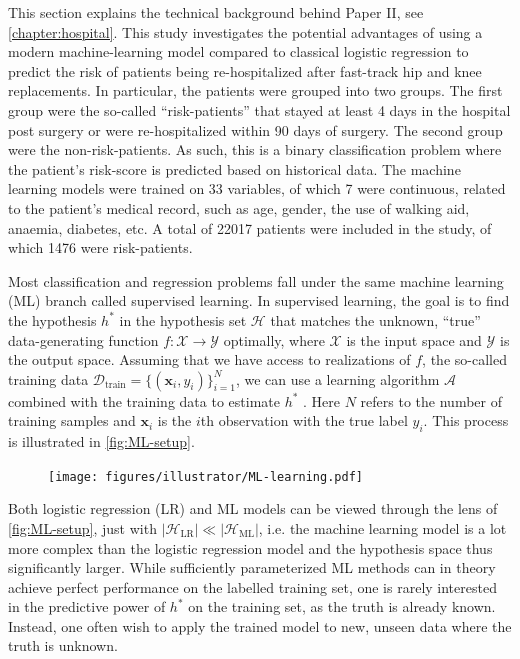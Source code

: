 
This section explains the technical background behind Paper II, see \autoref{chapter:hospital}. This study investigates the potential advantages of using a modern machine-learning model compared to classical logistic regression to predict the risk of patients being re-hospitalized after fast-track hip and knee replacements. In particular, the patients were grouped into two groups. The first group were the so-called ``risk-patients'' that stayed at least 4 days in the hospital post surgery or were re-hospitalized within 90 days of surgery. The second group were the non-risk-patients. As such, this is a binary classification problem where the patient's risk-score is predicted based on historical data. The machine learning models were trained on 33 variables, of which 7 were continuous, related to the patient's medical record, such as age, gender, the use of walking aid, anaemia, diabetes, etc. A total of \num{22017} patients were included in the study, of which \num{1476} were risk-patients.


Most classification and regression problems fall under the same machine learning (ML) branch called supervised learning. In supervised learning, the goal is to find the hypothesis $h^*$ in the hypothesis set $\mathcal{H}$ that matches the unknown, ``true'' data-generating function $f: \mathcal{X} \rightarrow \mathcal{Y}$ optimally, where $\mathcal{X}$ is the input space and $\mathcal{Y}$ is the output space. Assuming that we have access to realizations of $f$, the so-called training data $\mathcal{D}_\mathrm{train} = \{(\mathbf{x}_i, y_i)\}_{i=1}^N$, we can use a learning algorithm $\mathcal{A}$ combined with the training data to estimate $h^*$ \autocite{abu-mostafaLearningData2012a}. Here $N$ refers to the number of training samples and $\mathbf{x}_i$ is the $i$th observation with the true label $y_i$. This process is illustrated in \autoref{fig:ML-setup}.

\begin{figure}[htbp]
    \centering
    \texttt{[image: figures/illustrator/ML-learning.pdf]}
\end{figure}

Both logistic regression (LR) and ML models can be viewed through the lens of \autoref{fig:ML-setup}, just with $|\mathcal{H}_\mathrm{LR}| \ll |\mathcal{H}_\mathrm{ML}|$, i.e. the machine learning model is a lot more complex than the logistic regression model and the hypothesis space thus significantly larger. While sufficiently parameterized ML methods can in theory achieve perfect performance on the labelled training set, one is rarely interested in the predictive power of $h^*$ on the training set, as the truth is already known. Instead, one often wish to apply the trained model to new, unseen data where the truth is unknown.

